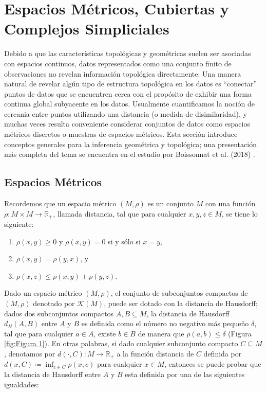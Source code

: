 \chapter{Espacios M\'etricos, Cubiertas y Complejos Simpliciales}

Debido a que las caracter\'isticas topol\'ogicas y geom\'etricas suelen ser asociadas con espacios continuos,
datos representados como una conjunto finito de observaciones no revelan informaci\'on topol\'ogica
directamente. Una manera natural de revelar alg\'un tipo de estructura topol\'ogica en los datos
es ``conectar'' puntos de datos que se encuentren cerca con el prop\'osito de exhibir una forma continua
global subyacente en los datos. Usualmente cuantificamos la noci\'on de cercania entre puntos utilizando
una distancia (o medida de disimilaridad), y muchas veces resulta conveniente considerar conjuntos de datos
como espacios m\'etricos discretos o muestras de espacios m\'etricos. Esta secci\'on introduce conceptos
generales para la inferencia geom\'etrica y topol\'ogica; una presentaci\'on m\'as completa del tema se
encuentra en el estudio por Boissonnat et al. (2018) \cite{Boissonnat2018}.

\section*{Espacios M\'etricos}

Recordemos que un espacio m\'etrico $\left(M, \rho\right)$ es un conjunto $M$ con una funci\'on
$\rho: M \times M \rightarrow \mathbb{R}_{+}$, llamada distancia, tal que para cualquier $x, y, z \in M$,
se tiene lo siguiente:

\begin{enumerate}[label=\roman*)]
    \item $\rho\left(x, y\right) \geq 0$ y $\rho\left(x, y\right) = 0$ si y s\'olo si $x = y$,
    
    \item $\rho\left(x, y\right) = \rho\left(y, x\right)$, y
    
    \item $\rho\left(x, z\right) \leq \rho\left(x, y\right) + \rho\left(y, z\right)$.
    
\end{enumerate}

Dado un espacio m\'etrico $\left(M, \rho\right)$, el conjunto de subconjuntos compactos de
$\left(M, \rho\right)$ denotado por $\mathcal{K}\left(M\right)$, puede ser dotado
con la distancia de Hausdorff; dados dos subconjuntos compactos $A, B \subseteq M$,
la distancia de Hausdorff $d_{H}\left(A, B\right)$ entre $A$ y $B$ es
definida como el n\'umero no negativo m\'as peque\~{n}o $\delta$, tal que para cualquier $a \in A$, existe
$b \in B$ de manera que $\rho\left(a, b\right) \leq \delta$ (Figura \ref{fig:Figura 1}). En otras palabras,
si dado cualquier subconjunto compacto $C \subseteq M$, denotamos por $d\left(\cdot, C\right):
M\rightarrow\mathbb{R}_{+}$ a la funci\'on distancia de $C$ definida por
$d\left(x, C\right) \coloneqq \inf_{c\in C}\rho\left(x, c\right)$ para cualquier $x \in M$, entonces se
puede probar que la distancia de Hausdorff entre $A$ y $B$ esta definida por una de las siguientes
igualdades:

